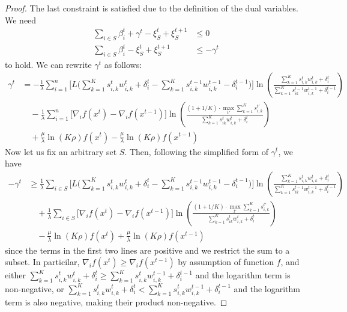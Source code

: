 \begin{proof}
The last constraint is satisfied due to the definition of the dual variables. We need
\begin{align*}
  \sum_{i \in S}\beta_{i}^{t} + \gamma^{t} - \xi_{S}^{t} + \xi_{S}^{t+1}  &\leq 0\\
  \sum_{i \in S}\beta_{i}^{t} - \xi_{S}^{t} + \xi_{S}^{t+1}  &\leq -\gamma^{t}
\end{align*}
%
to hold. We can rewrite $\gamma^{t}$ as follows:
\begin{align*}
    \gamma^{t} &= -  \frac{1}{\lambda} \sum_{i=1}^{n} \biggl[ L\biggl( \sum_{k=1}^{K} s_{i,k}^{t} w_{i,k}^{t} + \delta_{i}^{t} - \sum_{k=1}^{K} s_{i,k}^{t-1} w_{i,k}^{t-1} - \delta_{i}^{t-1} \biggr) \biggr]  \ln \left( \frac{\sum_{k=1}^{K} s_{i,k}^{t} w_{i,k}^{t} + \delta_{i}^{t}}{\sum_{k=1}^{K}  s_{ik}^{t-1}w_{i,k}^{t-1}  + \delta_{i}^{t-1}} \right) \\
    	& \quad - \frac{1}{\lambda} \sum_{i=1}^{n} \biggl[ \nabla_{i} f(x^{t}) - \nabla_{i} f(x^{t-1}) \biggr] \ln \left( \frac{(1 + 1/K) \cdot \max_{t'} \sum_{k=1}^{K} s_{i,k}^{t'}}{\sum_{k=1}^{K}  s_{ik}^{t}w_{i,k}^{t}  + \delta_{i}^{t}} \right)  \\
	& \quad + \frac{\mu}{\lambda} \ln(K\rho) f(x^{t}) - \frac{\mu}{\lambda} \ln(K\rho) f(x^{t-1})
\end{align*}
%
Now let us fix an arbitrary set $S$. Then, following the simplified form of $\gamma^t$, we have
\begin{align*}
    -\gamma^{t} &\geq     \frac{1}{\lambda} \sum_{i \in S} \biggl[ L\biggl( \sum_{k=1}^{K} s_{i,k}^{t} w_{i,k}^{t} + \delta_{i}^{t} - \sum_{k=1}^{K} s_{i,k}^{t-1} w_{i,k}^{t-1} - \delta_{i}^{t-1} \biggr) \biggr]  \ln \left( \frac{\sum_{k=1}^{K} s_{i,k}^{t} w_{i,k}^{t} + \delta_{i}^{t}}{\sum_{k=1}^{K}  s_{ik}^{t-1}w_{i,k}^{t-1}  + \delta_{i}^{t-1}} \right) \\
            & \quad + \frac{1}{\lambda} \sum_{i \in S} \biggl[ \nabla_{i} f(x^{t}) - \nabla_{i} f(x^{t-1}) \biggr] \ln \left( \frac{(1 + 1/K) \cdot \max_{t'} \sum_{k=1}^{K} s_{i,k}^{t'}}{\sum_{k=1}^{K}  s_{ik}^{t}w_{i,k}^{t}  + \delta_{i}^{t}} \right)  \\
        & \quad - \frac{\mu}{\lambda} \ln(K\rho) f(x^{t}) + \frac{\mu}{\lambda} \ln(K\rho) f(x^{t-1})
\end{align*}
%
since the terms in the first two lines are positive and we restrict the sum to a subset. In particilar, $\nabla_{i} f(x^{t}) \geq \nabla_{i} f(x^{t-1})$ by assumption of function $f$, and either $\sum_{k=1}^{K} s_{i,k}^{t} w_{i,k}^{t} + \delta_{i}^{t} \geq \sum_{k=1}^{K} s_{i,k}^{t} w_{i,k}^{t-1} + \delta_{i}^{t-1}$ and the logarithm term is non-negative, or $\sum_{k=1}^{K} s_{i,k}^{t} w_{i,k}^{t} + \delta_{i}^{t} < \sum_{k=1}^{K} s_{i,k}^{t} w_{i,k}^{t-1} + \delta_{i}^{t-1}$ and the logarithm term is also negative, making their product non-negative.

\end{proof}
